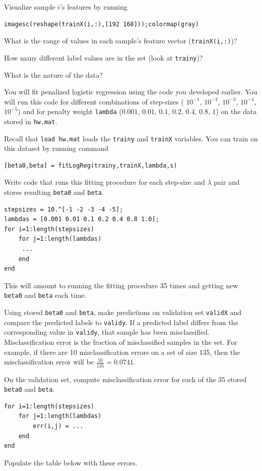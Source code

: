 \documentclass{article}
\begin{document}
Visualize sample $i$'s features by running 
\begin{verbatim}
imagesc(reshape(trainX(i,:),[192 168]));colormap(gray)
\end{verbatim}

What is the range of values in each sample's feature vector (\texttt{trainX(i,:)})? \answer

How many different label values are in the set (look at \texttt{trainy})? \answer

What is the nature of the data? \answer

\answer
\newproblem{2pt}
You will fit penalized logistic regression using the code you developed earlier. You will run this code for different combinations of step-sizes ( $10^{-1}$, $10^{-2}$, $10^{-3}$, $10^{-4}$, $10^{-5}$) and for penalty weight \texttt{lambda} ($0.001$, $0.01$, $0.1$, $0.2$, $0.4$, $0.8$, $1$) on the data stored in \texttt{hw\theHW.mat}.

Recall that \texttt{load hw\theHW.mat} loads the \texttt{trainy} and \texttt{trainX} variables.
You can train on this dataset by running command
\begin{verbatim}
[beta0,beta] = fitLogReg(trainy,trainX,lambda,s) 
\end{verbatim}

Write code that runs this fitting procedure for each step-size and $\lambda$ pair and stores resulting \texttt{beta0} and \texttt{beta}.
\begin{verbatim}
stepsizes = 10.^[-1 -2 -3 -4 -5];
lambdas = [0.001 0.01 0.1 0.2 0.4 0.8 1.0];
for i=1:length(stepsizes)
    for j=1:length(lambdas)
     ...
    end
end
\end{verbatim}
This will amount to running the fitting procedure 35 times and getting new \texttt{beta0} and \texttt{beta} each time. 


Using stored \texttt{beta0} and \texttt{beta}, make predictions on validation set \texttt{validX} and compare the predicted labels to \texttt{validy}. 
If a predicted label differs from the corresponding value in \texttt{validy}, that sample has been misclassified. Misclassification error is the fraction of misclassified samples in 
the set. For example, if there are 10 misclassification errors on a set of size 135, then the misclassification error will be $\frac{10}{135} = 0.0741$.

On the validation set, compute misclassification error for each of the 35 stored \texttt{beta0} and \texttt{beta}. 
\begin{verbatim}
for i=1:length(stepsizes)
    for j=1:length(lambdas)
        err(i,j) = ...
    end
end
\end{verbatim}
Populate the table below with these errors. 
\end{document}

